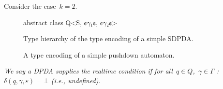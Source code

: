 Consider the case~$k=2$.
\begin{figure}
  \begin{JAVA}
abstract class Q<S, ¢$γ₁$¢, ¢$γ₂$¢>
  \end{JAVA}
\end{figure}

\begin{figure}
  \caption{\label{Figure:SDPDA:hierarchy}%
    Type hierarchy of the type encoding of a simple SDPDA.
  }
  \begin{adjustbox}{}
    
  \end{adjustbox}
\end{figure}

\begin{figure}
  \caption{\label{Figure:SDPDA:example}%
    A type encoding of a simple pushdown automaton.
  }
\end{figure}
\begin{Definition}
  \label{Definition:realtime}
  \slshape
We say a DPDA supplies the \emph{realtime condition} if
  for all~$q∈Q$,~$γ∈Γ$ :~$δ(q,γ,ε)=⊥$ (i.e., undefined).
\end{Definition}

